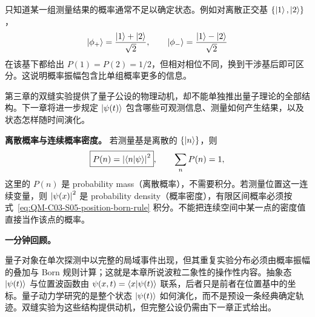 只知道某一组测量结果的概率通常不足以确定状态。例如对离散正交基 $\{\left|1\right\rangle,\left|2\right\rangle\}$，
\begin{equation}
  \left|\phi_+\right\rangle=\frac{\left|1\right\rangle+\left|2\right\rangle}{\sqrt2},
  \qquad
  \left|\phi_-\right\rangle=\frac{\left|1\right\rangle-\left|2\right\rangle}{\sqrt2}
  \label{eq:QM-C03-S05-relative-phase-states}
\end{equation}
在该基下都给出 $P(1)=P(2)=1/2$，但相对相位不同，换到干涉基后即可区分。这说明概率振幅包含比单组概率更多的信息。

第三章的双缝实验提供了量子公设的物理动机，却不能单独推出量子理论的全部结构。下一章将进一步规定 $\left|\psi(t)\right\rangle$ 包含哪些可观测信息、测量如何产生结果，以及状态怎样随时间演化。

\textbf{离散概率与连续概率密度。}
若测量基是离散的 $\{\left|n\right\rangle\}$，则
\begin{equation}
  \boxed{P(n)=\left|\left\langle n \middle| \psi \right\rangle\right|^2},
  \qquad
  \sum_nP(n)=1,
  \label{eq:QM-C03-S05-discrete-born-rule}
\end{equation}
这里的 $P(n)$ 是 probability mass（离散概率），不需要积分。若测量位置这一连续变量，则 $\left|\psi(x)\right|^2$ 是 probability density（概率密度），有限区间概率必须按式~\eqref{eq:QM-C03-S05-position-born-rule} 积分。不能把连续空间中某一点的密度值直接当作该点的概率。

\textbf{一分钟回顾。}

量子对象在单次探测中以完整的局域事件出现，但其重复实验分布必须由概率振幅的叠加与 Born 规则计算；这就是本章所说波粒二象性的操作性内容。抽象态 $\left|\psi(t)\right\rangle$ 与位置波函数由 $\psi(x,t)=\left\langle x \middle| \psi(t) \right\rangle$ 联系，后者只是前者在位置基中的坐标。量子动力学研究的是整个状态 $\left|\psi(t)\right\rangle$ 如何演化，而不是预设一条经典确定轨迹。双缝实验为这些结构提供动机，但完整公设仍需由下一章正式给出。
